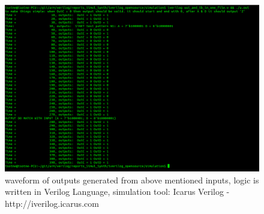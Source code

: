 \documentclass{article}
\begin{document}
\begin{figure}[H]
\centering
\includegraphics[width=\textwidth] {tb_iveriloglinux.png}
\caption{waveform of outputs generated from above mentioned inputs, logic is written in Verilog Language, simulation tool: Icarus Verilog - http://iverilog.icarus.com}
\label{fig:tb_iverloglinux}
\end{figure}




\end{document}
